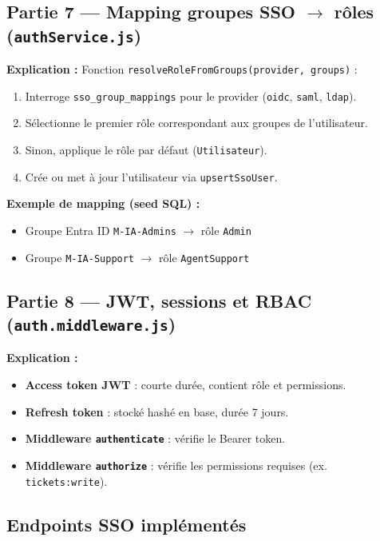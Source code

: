 \documentclass[12pt,a4paper]{article}
\begin{document}
\subsection{Partie 7 --- Mapping groupes SSO $\rightarrow$ rôles (\texttt{authService.js})}

\textbf{Explication :} Fonction \texttt{resolveRoleFromGroups(provider, groups)} :

\begin{enumerate}
  \item Interroge \texttt{sso\_group\_mappings} pour le provider (\texttt{oidc}, \texttt{saml}, \texttt{ldap}).
  \item Sélectionne le premier rôle correspondant aux groupes de l'utilisateur.
  \item Sinon, applique le rôle par défaut (\texttt{Utilisateur}).
  \item Crée ou met à jour l'utilisateur via \texttt{upsertSsoUser}.
\end{enumerate}

\textbf{Exemple de mapping (seed SQL) :}
\begin{itemize}
  \item Groupe Entra ID \texttt{M-IA-Admins} $\rightarrow$ rôle \texttt{Admin}
  \item Groupe \texttt{M-IA-Support} $\rightarrow$ rôle \texttt{AgentSupport}
\end{itemize}

\subsection{Partie 8 --- JWT, sessions et RBAC (\texttt{auth.middleware.js})}

\textbf{Explication :}

\begin{itemize}
  \item \textbf{Access token JWT} : courte durée, contient rôle et permissions.
  \item \textbf{Refresh token} : stocké hashé en base, durée 7 jours.
  \item \textbf{Middleware \texttt{authenticate}} : vérifie le Bearer token.
  \item \textbf{Middleware \texttt{authorize}} : vérifie les permissions requises (ex. \texttt{tickets:write}).
\end{itemize}

\subsection{Endpoints SSO implémentés}
\end{document}
